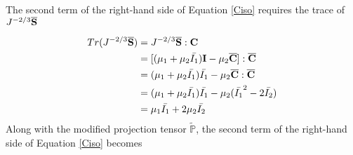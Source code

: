 The second term of the right-hand side of Equation \ref{Ciso} requires the trace of $J^{-2/3}\overline{\bold{S}}$

\begin{equation}
\begin{split}
Tr(J^{-2/3}\overline{\bold{S}}) &= J^{-2/3}{\overline{\bold{S}}} : {\bold{C}} \\
&= [(\mu_1 + \mu_2{\bar{I_1}})\bold{I} - \mu_2{\overline{\bold{C}}}] : \overline{\bold{C}} \\
&= (\mu_1 + \mu_2\bar{I_1})\bar{I_1} - \mu_2{\overline{\bold{C}}} : {\overline{\bold{C}}} \\
&= (\mu_1 + \mu_2\bar{I_1})\bar{I_1} - \mu_2({\bar{I_1}}^2 - 2\bar{I_2}) \\
&= \mu_1\bar{I_1} + 2\mu_2\bar{I_2}
\end{split}
\end{equation}
Along with the modified projection tensor $\tilde{\mathbb{P}}$, the second term of the right-hand side of Equation \ref{Ciso} becomes

